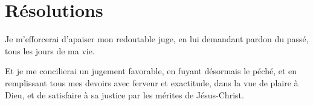 \documentclass[instructions.tex]{subfiles}
\begin{document}
\section{Résolutions}
 
\primo Je m'efforcerai d'apaiser mon redoutable juge, en lui demandant pardon du passé, tous les jours de ma vie.
 
\secundo Et je me concilierai un jugement favorable, en fuyant désormais le péché, et en remplissant tous mes devoirs avec ferveur et exactitude, dans la vue de plaire à Dieu, et de satisfaire à sa justice par les mérites de Jésus-Christ. 

 
\end{document}
